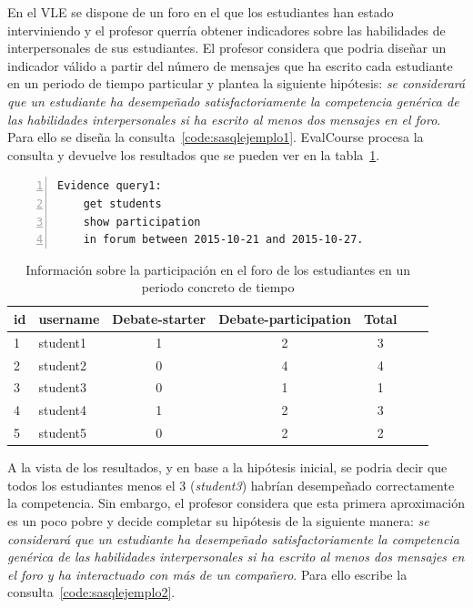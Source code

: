 

En el VLE se dispone de un foro en el que los estudiantes han estado interviniendo y el profesor querría obtener indicadores sobre las habilidades de interpersonales de sus estudiantes. El profesor considera que podria diseñar un indicador válido a partir del número de mensajes que ha escrito cada estudiante en un periodo de tiempo particular y plantea la siguiente hipótesis: \emph{se considerará que un estudiante ha desempeñado satisfactoriamente la competencia genérica de las habilidades interpersonales si ha escrito al menos dos mensajes en el foro}. Para ello se diseña la consulta~\ref{code:sasqlejemplo1}. EvalCourse procesa la consulta y devuelve los resultados que se pueden ver en la tabla~\ref{tab:EvalCourseEj1}.

\begin{lstlisting}[caption=Participación en el foro en un periodo concreto de tiempo ,label=code:sasqlejemplo1,numbers=left, captionpos=b, morekeywords={Evidence,get, students, show, milestones, participation, access, in, assignment, forum, campus, workshop, interaction, between, and}]
Evidence query1: 
	get students
	show participation
	in forum between 2015-10-21 and 2015-10-27.
\end{lstlisting}

\begin{table}
	\centering
	\caption{Información sobre la participación en el foro de los estudiantes en un periodo concreto de tiempo}
	\label{tab:EvalCourseEj1}
	\begin{tabular}{|l|l|c|c|c|c|c|}
		\hline
		id & username & Debate-starter & Debate-participation & Total \\
		\hline
		\hline
		1 & student1 & 1 & 2 & 3  \\
		\hline
		2 & student2 & 0 & 4 & 4  \\
		\hline
		3 & student3 & 0 & 1 & 1  \\
		\hline
		4 & student4 & 1 & 2 & 3  \\
		\hline
		5 & student5 & 0 & 2 & 2  \\
		\hline
	\end{tabular}
\end{table}

A la vista de los resultados, y en base a la hipótesis inicial, se podria decir que todos los estudiantes menos el 3 (\emph{student3}) habrían desempeñado correctamente la competencia. Sin embargo, el profesor considera que esta primera aproximación es un poco pobre y decide completar su hipótesis de la siguiente manera: \emph{se considerará que un estudiante ha desempeñado satisfactoriamente la competencia genérica de las habilidades interpersonales si ha escrito al menos dos mensajes en el foro y ha interactuado con más de un compañero}. Para ello escribe la consulta~\ref{code:sasqlejemplo2}. 

